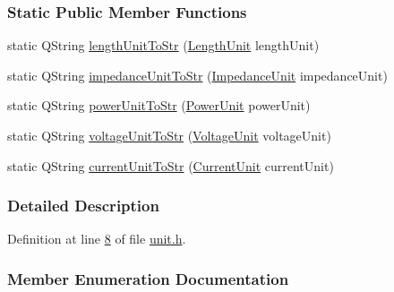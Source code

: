 \subsubsection*{Static Public Member Functions}
\begin{DoxyCompactItemize}
\item 
static Q\+String \hyperlink{class_unit_abd363319f79f97b0a0b9a08c5ddc3cdb}{length\+Unit\+To\+Str} (\hyperlink{class_unit_a8c8921f7b225ad6063b1cb573425b9a0}{Length\+Unit} length\+Unit)
\item 
static Q\+String \hyperlink{class_unit_ae3ca20f4b6530f04ca6aa138ec0fa7d2}{impedance\+Unit\+To\+Str} (\hyperlink{class_unit_a3747e779c805df24a71961290be3fbdf}{Impedance\+Unit} impedance\+Unit)
\item 
static Q\+String \hyperlink{class_unit_ad1487441b5a7eb93a3eb0aeebe947725}{power\+Unit\+To\+Str} (\hyperlink{class_unit_ace265ae255370ccacfd5370337572c3b}{Power\+Unit} power\+Unit)
\item 
static Q\+String \hyperlink{class_unit_a7fa103c31f9f069961b35b6371ff0c0a}{voltage\+Unit\+To\+Str} (\hyperlink{class_unit_a55b07dfa9457e1eca2c7194fe0cfc3c1}{Voltage\+Unit} voltage\+Unit)
\item 
static Q\+String \hyperlink{class_unit_a7bd3ed3edcb18170cd162d384075b651}{current\+Unit\+To\+Str} (\hyperlink{class_unit_a0794cf6c9682f48296dd4a5315389787}{Current\+Unit} current\+Unit)
\end{DoxyCompactItemize}


\subsubsection{Detailed Description}


Definition at line \hyperlink{unit_8h_source_l00008}{8} of file \hyperlink{unit_8h_source}{unit.\+h}.



\subsubsection{Member Enumeration Documentation}
\hypertarget{class_unit_a0794cf6c9682f48296dd4a5315389787}{}
